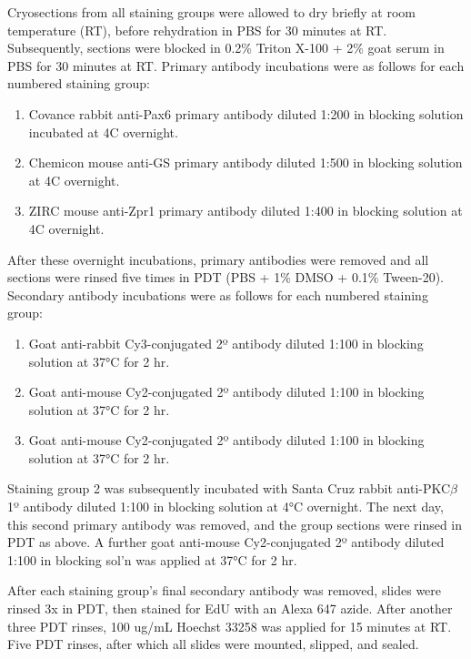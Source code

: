 Cryosections from all staining groups were allowed to dry briefly at room temperature (RT), before rehydration in PBS for 30 minutes at RT.  Subsequently, sections were blocked in 0.2\% Triton X-100 + 2\% goat serum in PBS for 30 minutes at RT. Primary antibody incubations were as follows for each numbered staining group:

\begin{enumerate}
    \item Covance rabbit anti-Pax6 primary antibody diluted 1:200 in blocking solution incubated at 4\degree C overnight.
    \item Chemicon mouse anti-GS primary antibody diluted 1:500 in blocking solution at 4\degree C overnight.
    \item ZIRC mouse anti-Zpr1 primary antibody diluted 1:400 in blocking solution at 4\degree C overnight.
\end{enumerate}

After these overnight incubations, primary antibodies were removed and all sections were rinsed five times in PDT (PBS + 1\% DMSO + 0.1\% Tween-20). Secondary antibody incubations were as follows for each numbered staining group:

\begin{enumerate}
    \item Goat anti-rabbit Cy3-conjugated 2º antibody diluted 1:100 in blocking solution at 37°C for 2 hr.
    \item Goat anti-mouse Cy2-conjugated 2º antibody diluted 1:100 in blocking solution at 37°C for 2 hr.
    \item Goat anti-mouse Cy2-conjugated 2º antibody diluted 1:100 in blocking solution at 37°C for 2 hr.
\end{enumerate}

Staining group 2 was subsequently incubated with Santa Cruz rabbit anti-PKC$\beta$ 1º antibody diluted 1:100 in blocking solution at 4°C overnight. The next day, this second primary antibody was removed, and the group sections were rinsed in PDT as above. A further goat anti-mouse Cy2-conjugated 2º antibody diluted 1:100 in blocking sol’n was applied at 37°C for 2 hr.

After each staining group's final secondary antibody was removed, slides were rinsed 3x in PDT, then stained for EdU with an Alexa 647 azide. After another three PDT rinses, 100 ug/mL Hoechst 33258 was applied for 15 minutes at RT. Five PDT rinses, after which all slides were mounted, slipped, and sealed.

